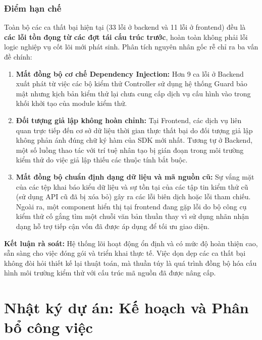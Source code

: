 \documentclass[12pt, a4paper]{article}
\begin{document}
\subsubsection{Điểm hạn chế}
Toàn bộ các ca thất bại hiện tại (33 lỗi ở backend và 11 lỗi ở frontend) đều là \textbf{các lỗi tồn đọng từ các đợt tái cấu trúc trước}, hoàn toàn không phải lỗi logic nghiệp vụ cốt lõi mới phát sinh. Phân tích nguyên nhân gốc rễ chỉ ra ba vấn đề chính:

\begin{enumerate}
    \item \textbf{Mất đồng bộ cơ chế Dependency Injection:} Hơn 9 ca lỗi ở Backend xuất phát từ việc các bộ kiểm thử Controller sử dụng hệ thống Guard bảo mật nhưng kịch bản kiểm thử lại chưa cung cấp dịch vụ cấu hình vào trong khối khởi tạo của module kiểm thử.
    \item \textbf{Đối tượng giả lập không hoàn chỉnh:} Tại Frontend, các dịch vụ liên quan trực tiếp đến cơ sở dữ liệu thời gian thực thất bại do đối tượng giả lập không phản ánh đúng chữ ký hàm của SDK mới nhất. Tương tự ở Backend, một số luồng thao tác với trí tuệ nhân tạo bị gián đoạn trong môi trường kiểm thử do việc giả lập thiếu các thuộc tính bắt buộc.
    \item \textbf{Mất đồng bộ chuẩn định dạng dữ liệu và mã nguồn cũ:} Sự vắng mặt của các tệp khai báo kiểu dữ liệu và sự tồn tại của các tập tin kiểm thử cũ (sử dụng API cũ đã bị xóa bỏ) gây ra các lỗi biên dịch hoặc lỗi tham chiếu. Ngoài ra, một component hiển thị tại frontend đang gặp lỗi do bộ công cụ kiểm thử cố gắng tìm một chuỗi văn bản thuần thay vì sử dụng nhãn nhận dạng hỗ trợ tiếp cận vốn đã được áp dụng để tối ưu giao diện.
\end{enumerate}

\textbf{Kết luận rà soát:} 
Hệ thống lõi hoạt động ổn định và có mức độ hoàn thiện cao, sẵn sàng cho việc đóng gói và triển khai thực tế. Việc dọn dẹp các ca thất bại không đòi hỏi thiết kế lại thuật toán, mà thuần túy là quá trình đồng bộ hóa cấu hình môi trường kiểm thử với cấu trúc mã nguồn đã được nâng cấp.

\section{Nhật ký dự án: Kế hoạch và Phân bổ công việc}
\end{document}
